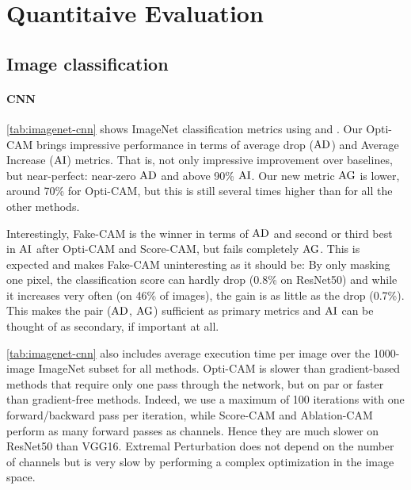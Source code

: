 \section{Quantitaive Evaluation}
\label{sec:oc_quant}

\subsection{Image classification}

\paragraph{CNN}
\autoref{tab:imagenet-cnn} shows ImageNet classification metrics using  and .
 Our Opti-CAM brings impressive performance in terms of average drop ($\operatorname{AD}$) and Average Increase 
 ($\operatorname{AI}$) metrics. That is, not only impressive improvement over baselines, but near-perfect: 
 near-zero $\operatorname{AD}$ and above 90\% $\operatorname{AI}$. Our new metric $\operatorname{AG}$ is lower, around 70\% 
 for Opti-CAM, but this is still several times higher than for all the other methods.

Interestingly, Fake-CAM \autocite{poppi2021revisiting} is the winner in terms of $\operatorname{AD}$ and second 
or third best in $\operatorname{AI}$ after Opti-CAM and Score-CAM, but fails completely $\operatorname{AG}$. This is expected 
and makes Fake-CAM uninteresting as it should be: By only masking one pixel, the classification 
score can hardly drop (0.8\% on ResNet50) and while it increases very often (on 46\% of images), 
the gain is as little as the drop (0.7\%). This makes the pair ($\operatorname{AD}$, $\operatorname{AG}$) sufficient as primary
 metrics and $\operatorname{AI}$ can be thought of as secondary, if important at all.



\autoref{tab:imagenet-cnn} also includes average execution time per image over the 1000-image 
ImageNet subset for all methods. Opti-CAM is slower than gradient-based methods that require 
only one pass through the network, but on par or faster than gradient-free methods. 
Indeed, we use a maximum of 100 iterations with one forward/backward pass per iteration, 
while Score-CAM and Ablation-CAM perform as many forward passes as channels. Hence they are much 
slower on ResNet50 than VGG16. Extremal Perturbation does not depend on the number of channels but 
is very slow by performing a complex optimization in the image space.

